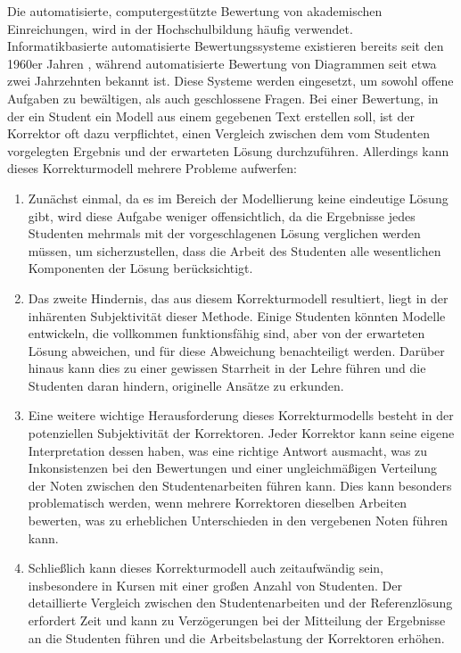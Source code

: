 Die automatisierte, computergestützte Bewertung von akademischen Einreichungen, wird in der Hochschulbildung häufig verwendet. Informatikbasierte automatisierte Bewertungssysteme existieren bereits seit den 1960er Jahren \cite{ullrich2021automated}, während automatisierte Bewertung von Diagrammen seit etwa zwei Jahrzehnten bekannt ist. Diese Systeme werden eingesetzt, um sowohl offene Aufgaben zu bewältigen, als auch geschlossene Fragen.  Bei einer Bewertung, in der ein Student ein Modell aus einem gegebenen Text erstellen soll, ist der Korrektor oft dazu verpflichtet, einen Vergleich zwischen dem vom Studenten vorgelegten Ergebnis und der erwarteten Lösung durchzuführen. Allerdings kann dieses Korrekturmodell mehrere Probleme aufwerfen:

\begin{enumerate}
    \item Zunächst einmal, da es im Bereich der Modellierung keine eindeutige Lösung gibt, wird diese Aufgabe weniger offensichtlich, da die Ergebnisse jedes Studenten mehrmals mit der vorgeschlagenen Lösung verglichen werden müssen, um sicherzustellen, dass die Arbeit des Studenten alle wesentlichen Komponenten der Lösung berücksichtigt.
    \item Das zweite Hindernis, das aus diesem Korrekturmodell resultiert, liegt in der inhärenten Subjektivität dieser Methode. Einige Studenten könnten Modelle entwickeln, die vollkommen funktionsfähig sind, aber von der erwarteten Lösung abweichen, und für diese Abweichung benachteiligt werden. Darüber hinaus kann dies zu einer gewissen Starrheit in der Lehre führen und die Studenten daran hindern, originelle Ansätze zu erkunden.
    \item Eine weitere wichtige Herausforderung dieses Korrekturmodells besteht in der potenziellen Subjektivität der Korrektoren. Jeder Korrektor kann seine eigene Interpretation dessen haben, was eine richtige Antwort ausmacht, was zu Inkonsistenzen bei den Bewertungen und einer ungleichmäßigen Verteilung der Noten zwischen den Studentenarbeiten führen kann. Dies kann besonders problematisch werden, wenn mehrere Korrektoren dieselben Arbeiten bewerten, was zu erheblichen Unterschieden in den vergebenen Noten führen kann.
    \item Schließlich kann dieses Korrekturmodell auch zeitaufwändig sein, insbesondere in Kursen mit einer großen Anzahl von Studenten. Der detaillierte Vergleich zwischen den Studentenarbeiten und der Referenzlösung erfordert Zeit und kann zu Verzögerungen bei der Mitteilung der Ergebnisse an die Studenten führen und die Arbeitsbelastung der Korrektoren erhöhen.
\end{enumerate}

